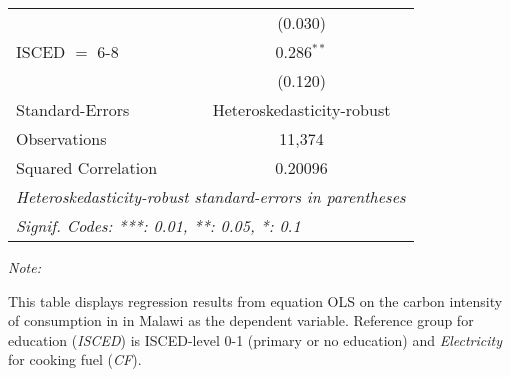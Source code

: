 \begin{table}[htbp!]
\begin{adjustbox}{width = 1\textwidth, max height = 0.95\textheight, center}
\begin{threeparttable}[b]
\begin{tabular}{lc}
                                & (0.030)\\   
            ISCED $=$ 6-8       & 0.286$^{**}$\\   
                                & (0.120)\\   
            \midrule 
            Standard-Errors     & Heteroskedasticity-robust \\   
            Observations        & 11,374\\  
            Squared Correlation & 0.20096\\  
            \midrule \midrule
            \multicolumn{2}{l}{\emph{Heteroskedasticity-robust standard-errors in parentheses}}\\
            \multicolumn{2}{l}{\emph{Signif. Codes: ***: 0.01, **: 0.05, *: 0.1}}\\
         \end{tabular}
         
         \begin{tablenotes}\item \medskip \textit{Note:}
            \item This table displays regression results from equation OLS on the carbon intensity of consumption in  in Malawi as the dependent variable. Reference group for education (\textit{ISCED}) is ISCED-level 0-1 (primary or no education) and \textit{Electricity} for cooking fuel (\textit{CF}).
         \end{tablenotes}
      \end{threeparttable}
   \end{adjustbox}
\end{table}


